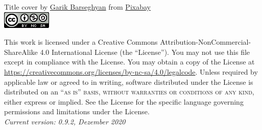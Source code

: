 \noindent Title cover by \href{https://pixabay.com/users/insspirito-1851261/?utm_source=link-attribution&amp;utm_medium=referral&amp;utm_campaign=image&amp;utm_content=1280089}{Garik Barseghyan} from \href{https://pixabay.com/?utm_source=link-attribution&amp;utm_medium=referral&amp;utm_campaign=image&amp;utm_content=1280089}{Pixabay}\\

\includegraphics[]{figures/license.png}

\noindent This work is licensed under a Creative Commons Attribution-NonCommercial-ShareAlike 4.0 International License (the ``License''). You may not use this file except in compliance with the License. You may obtain a copy of the License at \url{https://creativecommons.org/licenses/by-nc-sa/4.0/legalcode}. Unless required by applicable law or agreed to in writing, software distributed under the License is distributed on an \textsc{``as is'' basis, without warranties or conditions of any kind}, either express or implied. See the License for the specific language governing permissions and limitations under the License.\\ %

\noindent \textit{Current version: 0.9.2, Dezember 2020} %
\newpage
{}
